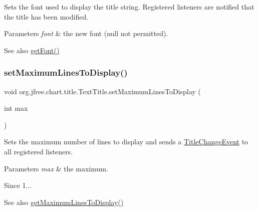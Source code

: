 Sets the font used to display the title string. Registered listeners are notified that the title has been modified.


\begin{DoxyParams}{Parameters}
{\em font} & the new font ({\ttfamily null} not permitted).\\
\hline
\end{DoxyParams}
\begin{DoxySeeAlso}{See also}
\mbox{\hyperlink{classorg_1_1jfree_1_1chart_1_1title_1_1_text_title_aee9adcb15d6cadf5ec0282cdf5225f53}{get\+Font()}} 
\end{DoxySeeAlso}
\mbox{\label{classorg_1_1jfree_1_1chart_1_1title_1_1_text_title_af91101629f0c35a40042faa41287c421}} 
\subsubsection{\texorpdfstring{set\+Maximum\+Lines\+To\+Display()}{setMaximumLinesToDisplay()}}
{\footnotesize\ttfamily void org.\+jfree.\+chart.\+title.\+Text\+Title.\+set\+Maximum\+Lines\+To\+Display (\begin{DoxyParamCaption}\item[{int}]{max }\end{DoxyParamCaption})}

Sets the maximum number of lines to display and sends a \mbox{\hyperlink{}{Title\+Change\+Event}} to all registered listeners.


\begin{DoxyParams}{Parameters}
{\em max} & the maximum.\\
\hline
\end{DoxyParams}
\begin{DoxySince}{Since}
1...
\end{DoxySince}
\begin{DoxySeeAlso}{See also}
\mbox{\hyperlink{classorg_1_1jfree_1_1chart_1_1title_1_1_text_title_ac50f9750ffef5ef70eb7b5990d0f50e3}{get\+Maximum\+Lines\+To\+Display()}} 
\end{DoxySeeAlso}
\mbox{\label{classorg_1_1jfree_1_1chart_1_1title_1_1_text_title_aabe0fdb633a983b1236433c4fd60dd3f}} 
